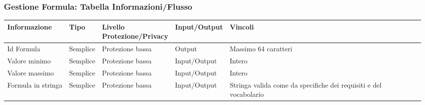\documentclass[a4paper, 11pt]{article}
\let\newline\\
\begin{document}
\vspace{2em}

\subsubsection*{Gestione Formula: Tabella Informazioni/Flusso}
\begin{adjustwidth}{-1.5cm}{-1.5cm}
\begin{center}
    \begin{tabular}{|p{3cm}|p{1.5cm}|p{3.5cm}|p{2.5cm}|p{4cm}|}
        \hline
        \textbf{Informazione} & \textbf{Tipo} & \textbf{Livello \newline Protezione/Privacy} & \textbf{Input/Output}&\textbf{Vincoli}\\
        \hline
         Id Formula& Semplice & Protezione bassa & Output & Massimo 64 caratteri \\\hline
        Valore minimo & Semplice & Protezione bassa & Input/Output & Intero \\\hline
        Valore massimo & Semplice & Protezione bassa & Input/Output & Intero \\\hline
        Formula in stringa & Semplice & Protezione bassa & Input/Output & Stringa valida come da specifiche dei requisiti e del vocabolario \\\hline
    \end{tabular}
\end{center}
\end{adjustwidth}

\vspace{2em}
\end{document}
